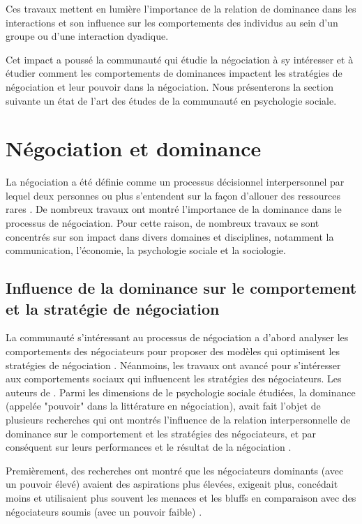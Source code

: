 			Ces travaux mettent en lumière l'importance de la relation de dominance dans les interactions et son influence sur les comportements des individus au sein d'un groupe ou d'une interaction dyadique.
			
			Cet impact a poussé la communauté qui étudie la négociation à sy intéresser et à étudier comment les comportements de dominances impactent les stratégies de négociation et leur pouvoir dans la négociation. 
			Nous présenterons la section suivante un état de l'art des études de la communauté en psychologie sociale.
			
			
	\section{Négociation et dominance}
	\label{sec:domNego}
	La négociation a été définie comme un processus décisionnel interpersonnel par lequel deux personnes ou plus s'entendent sur la façon d'allouer des ressources rares \cite{thompson2000mind}. De nombreux travaux \cite{de1995impact,van2006power,fiske1993controlling} ont montré l'importance de la dominance dans le processus de négociation. Pour cette raison, de nombreux travaux se sont concentrés sur son impact dans divers domaines et disciplines, notamment la communication, l'économie, la psychologie sociale et la sociologie.
	

	
	\subsection{Influence de la dominance sur le comportement et la stratégie de négociation}
	
	La communauté s'intéressant au processus de négociation a d'abord analyser les comportements des négociateurs pour proposer des modèles qui optimisent les stratégies de négociation \cite{thompson2010negotiation}.
	Néanmoins, les travaux ont avancé pour s'intéresser aux comportements sociaux qui influencent les stratégies des négociateurs. Les auteurs de \cite{thompson2010negotiation}. Parmi les dimensions de le psychologie sociale étudiées, la dominance  (appelée "pouvoir" dans la littérature en négociation), avait fait l'objet de plusieurs recherches qui ont montrés l'influence  de la relation interpersonnelle de dominance sur le comportement et les stratégies des négociateurs, et par conséquent sur leurs performances et le résultat de la négociation \cite{de1995impact,van2006power}.
	
	Premièrement, des recherches ont montré que les négociateurs dominants (avec un pouvoir élevé) avaient des aspirations plus élevées, exigeait plus, concédait moins et utilisaient plus souvent les menaces et les bluffs en comparaison avec des négociateurs soumis (avec un pouvoir faible) \cite{de1995impact}.
	
